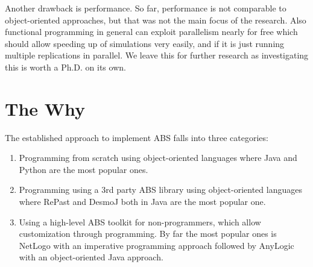 Another drawback is performance. So far, performance is not comparable to object-oriented approaches, but that was not the main focus of the research. Also functional programming in general can exploit parallelism nearly for free which should allow speeding up of simulations very easily, and if it is just running multiple replications in parallel. We leave this for further research as investigating this is worth a Ph.D. on its own.

\section{The Why}

The established approach to implement ABS falls into three categories:
\begin{enumerate}
	\item Programming from scratch using object-oriented languages where Java and Python are the most popular ones.
	\item Programming using a 3rd party ABS library using object-oriented languages where RePast and DesmoJ both in Java are the most popular one.
	\item Using a high-level ABS toolkit for non-programmers, which allow customization through programming. By far the most popular ones is NetLogo with an imperative programming approach followed by AnyLogic with an object-oriented Java approach.
\end{enumerate}

